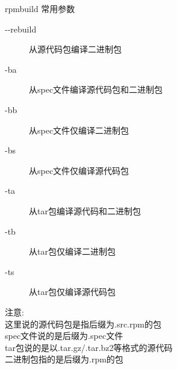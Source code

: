 \begin{frame}{rpmbuild 常用参数}
\begin{description}
\item[-{}-rebuild] 从源代码包编译二进制包
\item[-ba] 从spec文件编译源代码包和二进制包
\item[-bb] 从spec文件仅编译二进制包
\item[-bs] 从spec文件仅编译源代码包
\item[-ta] 从tar包编译源代码和二进制包
\item[-tb] 从tar包仅编译二进制包
\item[-ts] 从tar包仅编译源代码包
\end{description}
注意: \\
这里说的源代码包是指后缀为.src.rpm的包 \\
spec文件说的是后缀为.spec文件 \\
tar包说的是以.tar.gz/.tar.bz2等格式的源代码 \\
二进制包指的是后缀为.rpm的包
\end{frame}

